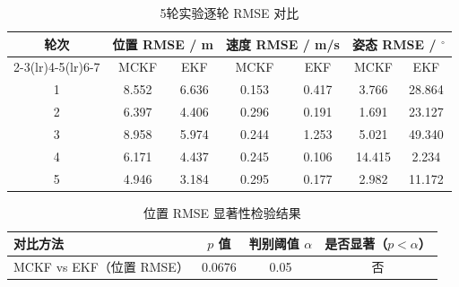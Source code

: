 \begin{table}[htbp]
\centering
\caption{5轮实验逐轮 RMSE 对比}
\label{tab:ch4_round_rmse}
\begin{tabular}{ccccccc}
\toprule[1.5pt]
轮次 & \multicolumn{2}{c}{位置 RMSE / m} & \multicolumn{2}{c}{速度 RMSE / m/s} & \multicolumn{2}{c}{姿态 RMSE / $^{\circ}$} \\
\cmidrule(lr){2-3}\cmidrule(lr){4-5}\cmidrule(lr){6-7}
& MCKF & EKF & MCKF & EKF & MCKF & EKF \\
\midrule[1pt]
1 & 8.552 & 6.636 & 0.153 & 0.417 & 3.766 & 28.864 \\
2 & 6.397 & 4.406 & 0.296 & 0.191 & 1.691 & 23.127 \\
3 & 8.958 & 5.974 & 0.244 & 1.253 & 5.021 & 49.340 \\
4 & 6.171 & 4.437 & 0.245 & 0.106 & 14.415 & 2.234 \\
5 & 4.946 & 3.184 & 0.295 & 0.177 & 2.982 & 11.172 \\
\bottomrule[1.5pt]
\end{tabular}
\end{table}

\begin{table}[htbp]
\centering
\caption{位置 RMSE 显著性检验结果}
\label{tab:ch4_pvalue_test}
\begin{tabular}{lccc}
\toprule[1.5pt]
对比方法 & $p$ 值 & 判别阈值 $\alpha$ & 是否显著（$p<\alpha$） \\
\midrule[1pt]
MCKF vs EKF（位置 RMSE） & 0.0676 & 0.05 & 否 \\
\bottomrule[1.5pt]
\end{tabular}
\end{table}



